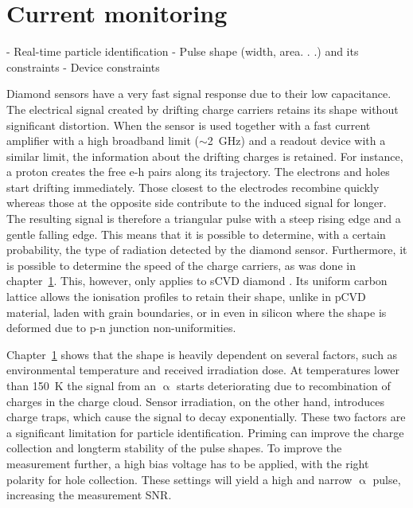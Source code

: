 \documentclass[12pt]{mytustyle}  %
\begin{document}
\baselineskip=15pt



\chapter{Current monitoring}
	- Real-time particle identification
		- Pulse shape (width, area. . .) and its constraints
		- Device constraints

Diamond sensors have a very fast signal response due to their low capacitance. The electrical signal created by drifting charge carriers retains its shape without significant distortion. When the sensor is used together with a fast current amplifier with a high broadband limit ($\sim$2~GHz) and a readout device with a similar limit, the information about the drifting charges is retained. For instance, a proton creates the free e-h pairs along its trajectory. The electrons and holes start drifting immediately. Those closest to the electrodes recombine quickly whereas those at the opposite side contribute to the induced signal for longer. The resulting signal is therefore a triangular pulse with a steep rising edge and a gentle falling edge. This means that it is possible to determine, with a certain probability, the type of radiation detected by the diamond sensor. Furthermore, it is possible to determine the speed of the charge carriers, as was done in chapter~\ref{}. This, however, only applies to sCVD diamond . Its uniform carbon lattice allows the ionisation profiles to retain their shape, unlike in pCVD material, laden with grain boundaries, or in even in silicon where the shape is deformed due to p-n junction non-uniformities.

Chapter~\ref{} shows that the shape is heavily dependent on several factors, such as environmental temperature and received irradiation dose. At temperatures lower than 150~K the signal from an $\upalpha$ starts deteriorating due to recombination of charges in the charge cloud. Sensor irradiation, on the other hand, introduces charge traps, which cause the signal to decay exponentially. These two factors are a significant limitation for particle identification. Priming can improve the charge collection and longterm stability of the pulse shapes. To improve the measurement further, a high bias voltage has to be applied, with the right polarity for hole collection. These settings will yield a high and narrow $\upalpha$ pulse, increasing the measurement SNR. 
\end{document}
